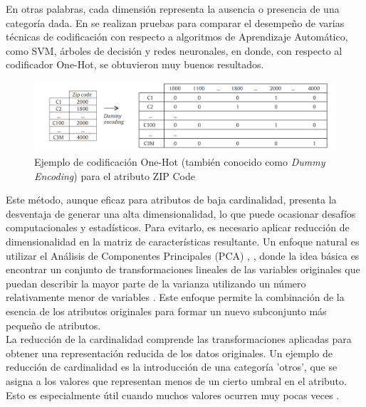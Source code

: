 En otras palabras, cada dimensión representa la ausencia o presencia de una categoría dada. En \citep{hooi2022feature} se realizan pruebas para comparar el desempeño de varias técnicas de codificación con respecto a algoritmos de Aprendizaje Automático, como SVM, árboles de decisión y redes neuronales, en donde, con respecto al codificador One-Hot, se obtuvieron muy buenos resultados. 
\begin{figure}[H]
	\centering
	\includegraphics[width=0.8\linewidth]{"figuras/capi 1/one-hot-ejemplo"}
	\caption{Ejemplo de codificación One-Hot (también conocido como \textit{Dummy Encoding}) para el atributo ZIP Code}
	\label{fig:one-hot-ejemplo}
\end{figure}
Este método, aunque eficaz para atributos de baja cardinalidad, presenta la desventaja de generar una alta dimensionalidad, lo que puede ocasionar desafíos computacionales y estadísticos. Para evitarlo, es necesario aplicar reducción de dimensionalidad en la matriz de características resultante. Un enfoque natural es utilizar el Análisis de Componentes Principales (PCA) \citep{mahmood2022accurate}, \citep{kasemtaweechok2021large} , donde la idea básica es encontrar un conjunto de transformaciones lineales de las variables originales que puedan describir la mayor parte de la varianza utilizando un número relativamente menor de variables \citep{garcia2015data}. Este enfoque permite la combinación de la esencia de los atributos originales para formar un nuevo subconjunto más pequeño de atributos. \\
La reducción de la cardinalidad comprende las transformaciones aplicadas para obtener una representación reducida de los datos originales. Un ejemplo de reducción de cardinalidad es la introducción de una categoría 'otros', que se asigna a los valores que representan menos de un cierto umbral en el atributo. Esto es especialmente útil cuando muchos valores ocurren muy pocas veces \citep{ventevogel2020construction}.

